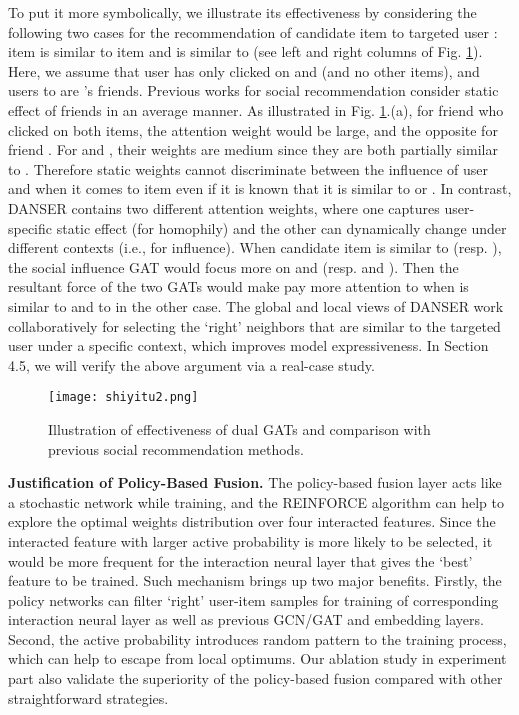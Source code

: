 \documentclass[sigconf]{acmart}
\begin{document}
{
To put it more symbolically, we illustrate its effectiveness by  considering the following two cases for the recommendation of candidate item  to targeted user : item  is similar to item  and  is similar to  (see left and right columns of Fig. \ref{fig-shiyitu2}). 
Here, we assume that user  has only clicked on  and  (and no other items), and 
users  {to}  are 's friends. 
}
Previous works for social recommendation consider static effect of friends in an average manner. 
{As {illustrated} in Fig. \ref{fig-shiyitu2}.(a), for friend  who {clicked on} both items, the attention weight would be large, and {the opposite} for friend . 
For  and , their weights are medium since they are both partially similar to . }
{Therefore} static weights cannot discriminate {between the} influence of user  and  when it comes to item { even if it is known that it is similar to  or }. 
{In} contrast, DANSER contains two different attention weights, where one captures user-specific static effect (for homophily) and the other can dynamically change under different contexts (i.e., for influence).
{When candidate item  is similar to  (resp. ), the social influence GAT would focus more on  and  (resp.  and ).}
Then the resultant force of {the} two GATs would make  pay more attention to  {when  is similar to }
and to  {in the other case.}
The global and local views of DANSER work collaboratively for selecting {the} `right' neighbors that are similar to {the} targeted user under a specific context, which improves model expressiveness. 
In Section 4.5, we will verify the above argument via a real-case study.

\begin{figure}[t]
\vspace{-5pt}
\setlength{\abovecaptionskip}{-0.1cm}
	\centering
	\texttt{[image: shiyitu2.png]}
	\vspace{2pt}
	\caption{Illustration of effectiveness of dual GATs and comparison with previous social recommendation methods.}
	\label{fig-shiyitu2}
	\vspace{-10pt}
\end{figure}

\textbf{Justification of Policy-Based Fusion.}
The policy-based fusion layer acts like a stochastic network while training, and the REINFORCE algorithm can help to explore the optimal weights distribution over four interacted features. Since the interacted feature with larger active probability is more likely to be selected, it would be more frequent for the interaction neural layer that gives the `best' feature to be trained. Such mechanism brings up two major benefits. Firstly, the policy networks can filter `right' user-item samples for training of corresponding interaction neural layer as well as previous GCN/GAT and embedding layers. Second, the active probability introduces random pattern to the training process, which can help to escape from local optimums. Our ablation study in experiment part also validate the superiority of the policy-based fusion compared with other straightforward strategies.
\end{document}
